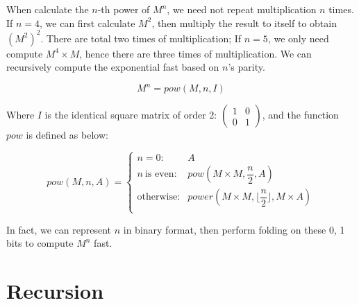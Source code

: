 \documentclass[UTF8]{article}
\begin{document}
\begin{enumerate}
When calculate the $n$-th power of $M^n$, we need not repeat multiplication $n$ times. If $n = 4$, we can first calculate $M^2$, then multiply the result to itself to obtain $(M^2)^2$. There are total two times of multiplication; If $n = 5$, we only need compute $M^4 \times M$, hence there are three times of multiplication. We can recursively compute the exponential fast based on $n$'s parity.

\[
M^n = pow(M, n, I)
\]

Where $I$ is the identical square matrix of order 2: $\displaystyle \begin{pmatrix} 1 & 0 \\ 0 & 1\end{pmatrix}$, and the function $pow$ is defined as below:

\[
pow(M, n, A) = \begin{cases}
n = 0: & A \\
n\ \text{is even}: & pow(M \times M, \dfrac{n}{2}, A) \\
\text{otherwise}: & power(M \times M, \lfloor \dfrac{n}{2} \rfloor, M \times A)\\
\end{cases}
\]

In fact, we can represent $n$ in binary format, then perform folding on these 0, 1 bits to compute $M^n$ fast.

\end{enumerate}

\section{Recursion}
\end{document}
